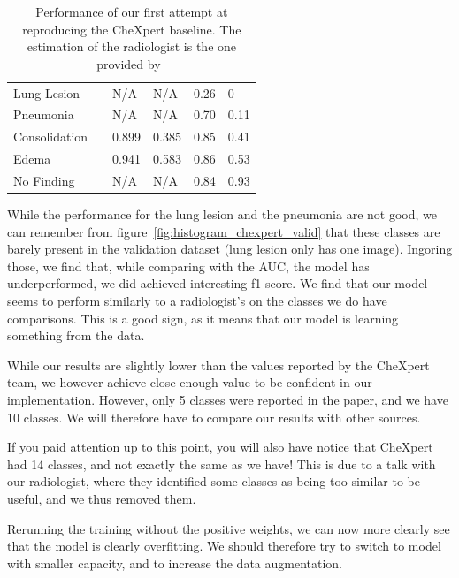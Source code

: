 \documentclass[11pt]{article}
\begin{document}
\begin{table}[]
\begin{tabular}{@{}llllll@{}}
                        Lung Lesion      &  & N/A   & N/A  & 0.26 & 0    \\
                        Pneumonia        &  & N/A   & N/A  & 0.70 & 0.11 \\
                        Consolidation    &  & 0.899 & 0.385  & 0.85 & 0.41 \\
                        Edema            &  & 0.941 & 0.583  & 0.86 & 0.53 \\
                        No Finding       &  & N/A   & N/A  & 0.84 & 0.93 \\ \bottomrule
                        \end{tabular}
                        \label{fig:chexpert1_performance}
                        \caption{Performance of our first attempt at reproducing the CheXpert baseline. The estimation of the radiologist is the one provided by~\cite{chexzero}}
                \end{table}
                While the  performance for the lung lesion and the pneumonia are not good, we can remember from figure~\ref{fig:histogram_chexpert_valid} that these classes are barely present in the validation dataset (lung lesion only has one image). Ingoring those, we
                find that, while comparing with the AUC, the model has underperformed, we did achieved interesting f1-score. We find that our model seems to perform similarly to a radiologist's on the classes we do have comparisons. This is a good sign, as it means that our model is learning something from the data.

                While our results are slightly lower than the values reported by the CheXpert team, we however achieve close enough value to be confident in our implementation.
                However, only 5 classes were reported in the paper, and we have 10 classes. We will therefore have to compare our results with other sources.

                If you paid attention up to this point, you will also have notice that CheXpert had 14 classes, and not exactly the same as we have!
                This is due to a talk with our radiologist, where they identified some classes as being too similar to be useful, and we thus removed them.


                Rerunning the training without the positive weights, we can now more clearly see that the model is clearly overfitting.
                We should therefore try to switch to model with smaller capacity, and to increase the data augmentation.
\end{document}
